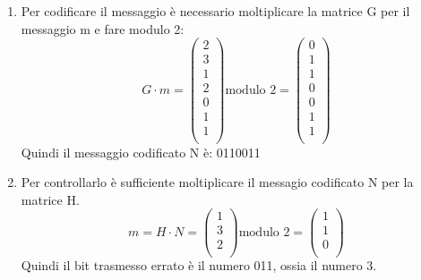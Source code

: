 \documentclass{article}
\begin{document}
\begin{enumerate}
\[\begin{pmatrix}
            0 & 0 & 1 & 0 \\
            0 & 0 & 0 & 1 \\
          \end{pmatrix}
    \]
    G, invece, è la matrice creata a partire da H con le colonne cancellate. Nello specifico, per ogni colonna in ordine, se è cancellata vanno ricopiati i bit della riga che sono rimasti, se non è cancellata va copiata una riga della matrice identità.
    \item Per codificare il messaggio è necessario moltiplicare la matrice G per il messaggio m e fare modulo 2: 
    \[
        G \cdot m = 
          \begin{pmatrix}
            2 \\
            3 \\
            1 \\
            2 \\
            0 \\
            1 \\
            1 \\
          \end{pmatrix} 
        \text{modulo 2} =
          \begin{pmatrix}
            0 \\
            1 \\
            1 \\
            0 \\
            0 \\
            1 \\
            1 \\
         \end{pmatrix} 
    \]
    Quindi il messaggio codificato N è: 0110011
    \item Per controllarlo è sufficiente moltiplicare il messagio codificato N per la matrice H.
    \[
        m = H \cdot N = 
            \begin{pmatrix}
                1 \\
                3 \\
                2 \\
            \end{pmatrix}
        \text{modulo 2} = 
            \begin{pmatrix}
                1 \\
                1 \\
                0 \\
            \end{pmatrix}
    \]
    Quindi il bit trasmesso errato è il numero 011, ossia il numero 3.
\end{enumerate}
\end{document}
